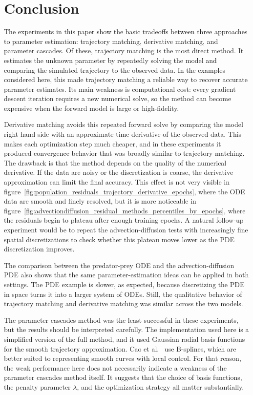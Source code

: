 \documentclass{article}
\begin{document}
\FloatBarrier
\section{Conclusion}

The experiments in this paper show the basic tradeoffs between three approaches to parameter estimation: trajectory matching, derivative matching, and parameter cascades. Of these, trajectory matching is the most direct method. It estimates the unknown parameter by repeatedly solving the model and comparing the simulated trajectory to the observed data. In the examples considered here, this made trajectory matching a reliable way to recover accurate parameter estimates. Its main weakness is computational cost: every gradient descent iteration requires a new numerical solve, so the method can become expensive when the forward model is large or high-fidelity.

Derivative matching avoids this repeated forward solve by comparing the model right-hand side with an approximate time derivative of the observed data. This makes each optimization step much cheaper, and in these experiments it produced convergence behavior that was broadly similar to trajectory matching. The drawback is that the method depends on the quality of the numerical derivative. If the data are noisy or the discretization is coarse, the derivative approximation can limit the final accuracy. This effect is not very visible in figure~\ref{fig:population_residuals_trajectory_derivative_epochs}, where the ODE data are smooth and finely resolved, but it is more noticeable in figure~\ref{fig:advectiondiffusion_residual_methods_percentiles_by_epochs}, where the residuals begin to plateau after enough training epochs. A natural follow-up experiment would be to repeat the advection-diffusion tests with increasingly fine spatial discretizations to check whether this plateau moves lower as the PDE discretization improves.

The comparison between the predator-prey ODE and the advection-diffusion PDE also shows that the same parameter-estimation ideas can be applied in both settings. The PDE example is slower, as expected, because discretizing the PDE in space turns it into a larger system of ODEs. Still, the qualitative behavior of trajectory matching and derivative matching was similar across the two models.

The parameter cascades method was the least successful in these experiments, but the results should be interpreted carefully. The implementation used here is a simplified version of the full method, and it used Gaussian radial basis functions for the smooth trajectory approximation. Cao et al.~\cite{cao2008estimating} use B-splines, which are better suited to representing smooth curves with local control. For that reason, the weak performance here does not necessarily indicate a weakness of the parameter cascades method itself. It suggests that the choice of basis functions, the penalty parameter $\lambda$, and the optimization strategy all matter substantially.
\end{document}
